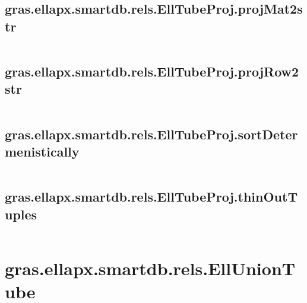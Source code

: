 \subsection{\texorpdfstring{gras.ellapx.smartdb.rels.EllTubeProj.projMat2str}{projMat2str}}\label{method:gras.ellapx.smartdb.rels.EllTubeProj.projMat2str}
\begin{verbatim}

\end{verbatim}
\subsection{\texorpdfstring{gras.ellapx.smartdb.rels.EllTubeProj.projRow2str}{projRow2str}}\label{method:gras.ellapx.smartdb.rels.EllTubeProj.projRow2str}
\begin{verbatim}

\end{verbatim}
\subsection{\texorpdfstring{gras.ellapx.smartdb.rels.EllTubeProj.sortDetermenistically}{sortDetermenistically}}\label{method:gras.ellapx.smartdb.rels.EllTubeProj.sortDetermenistically}
\begin{verbatim}

\end{verbatim}
\subsection{\texorpdfstring{gras.ellapx.smartdb.rels.EllTubeProj.thinOutTuples}{thinOutTuples}}\label{method:gras.ellapx.smartdb.rels.EllTubeProj.thinOutTuples}
\begin{verbatim}

\end{verbatim}
\section{gras.ellapx.smartdb.rels.EllUnionTube}\label{secClassDescr:gras.ellapx.smartdb.rels.EllUnionTube}
